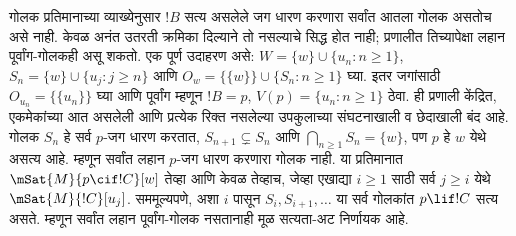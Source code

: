 \documentclass[../../../include/open-logic-section]{subfiles}
\begin{document}
गोलक प्रतिमानाच्या व्याख्येनुसार $!B$ सत्य असलेले
जग धारण करणारा सर्वांत आतला गोलक असतोच असे नाही.
केवळ अनंत उतरती क्रमिका दिल्याने तो नसल्याचे सिद्ध होत नाही;
प्रणालीत तिच्यापेक्षा लहान पूर्वांग-गोलकही असू शकतो.
एक पूर्ण उदाहरण असे: $W=\{w\}\cup\{u_n:n\geq1\}$,
$S_n=\{w\}\cup\{u_j:j\geq n\}$ आणि
$O_w=\{\{w\}\}\cup\{S_n:n\geq1\}$ घ्या.
इतर जगांसाठी $O_{u_n}=\{\{u_n\}\}$ घ्या आणि
पूर्वांग म्हणून $!B=p$, $V(p)=\{u_n:n\geq1\}$ ठेवा.
ही प्रणाली केंद्रित, एकमेकांच्या आत असलेली आणि प्रत्येक
रिक्त नसलेल्या उपकुलाच्या संघटनाखाली व छेदाखाली बंद आहे.
गोलक $S_n$ हे सर्व $p$-जग धारण करतात,
$S_{n+1}\subsetneq S_n$ आणि $\bigcap_{n\geq1}S_n=\{w\}$,
पण $p$ हे $w$ येथे असत्य आहे. म्हणून सर्वांत लहान
$p$-जग धारण करणारा गोलक नाही.
या प्रतिमानात $\mSat{M}{p\cif !C}[w]$ तेव्हा आणि केवळ तेव्हाच,
जेव्हा एखाद्या $i\geq1$ साठी सर्व $j\geq i$ येथे
$\mSat{M}{!C}[u_j]$. सममूल्यपणे, अशा $i$ पासून
$S_i,S_{i+1},\dots$ या सर्व गोलकांत $p\lif !C$ सत्य असते.
म्हणून सर्वांत लहान पूर्वांग-गोलक नसतानाही मूळ सत्यता-अट
निर्णायक आहे.
\end{document}
